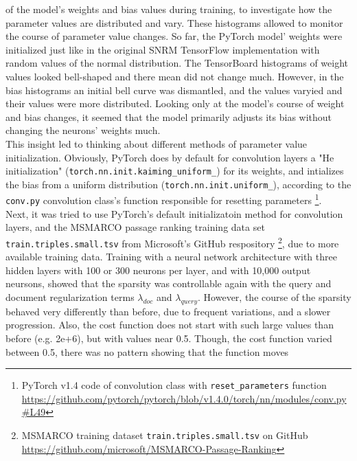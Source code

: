    of the model's weights and bias values during training, to investigate how the parameter
    values are distributed and vary.
These histograms allowed to monitor the course of parameter value changes.
So far, the PyTorch model' weights were initialized just like in the original SNRM TensorFlow
    implementation with random values of the normal distribution.
The TensorBoard histograms of weight values looked bell-shaped and there mean did not change much.
However, in the bias histograms an initial bell curve was dismantled, and the values 
    varyied and their values were more distributed.
Looking only at the model's course of weight and bias changes, it seemed that the model
    primarily adjusts its bias without changing the neurons' weights much.\\
This insight led to thinking about different methods of parameter value initialization.
Obviously, PyTorch does by default for convolution layers a 
    "He initialization" (\texttt{torch.nn.init.kaiming\_uniform\_}) for its weights,
    and intializes the bias from a uniform distribution (\texttt{torch.nn.init.uniform\_}),
    according to the \texttt{conv.py} convolution class's function
    responsible for resetting parameters
    \footnote{PyTorch v1.4 code of convolution class with \texttt{reset\_parameters} function \url{https://github.com/pytorch/pytorch/blob/v1.4.0/torch/nn/modules/conv.py\#L49}}.\\
Next, it was tried to use PyTorch's default initializatoin method for convolution layers,
    and the MSMARCO passage ranking training data set \texttt{train.triples.small.tsv} from Microsoft's 
    GitHub respository
    \footnote{MSMARCO training dataset \texttt{train.triples.small.tsv} on GitHub \url{https://github.com/microsoft/MSMARCO-Passage-Ranking}},
    due to more available training data.
Training with a neural network architecture with three hidden layers with 100 or 300 neurons per layer,
    and with 10,000 output neursons, showed that the sparsity was controllable again with 
    the query and document regularization terms $\lambda_{doc}$ and $\lambda_{query}$.
However, the course of the sparsity behaved very differently than before, due to frequent variations,
    and a slower progression.
Also, the cost function does not start with such large values than before (e.g. 2e+6),
    but with values near 0.5.
Though, the cost function varied between 0.5, there was no pattern showing that the function moves 
